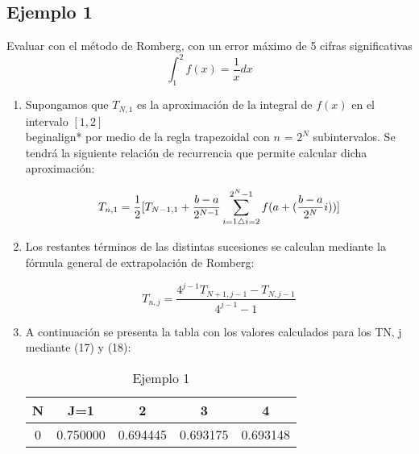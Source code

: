 \documentclass[journal,transmag]{IEEEtran}
\theoremstyle{mytheoremstyle}
\theoremstyle{mytheoremstyle}
\theoremstyle{myproblemstyle}
\begin{document}
    \subsection{Ejemplo 1}
    Evaluar con el método de Romberg, con un error máximo de 5 cifras significativas
    \begin{equation} 
        \int_1^2 f(x)=\frac{1}{x} dx
    \end{equation}
    \begin{enumerate}
    \item Supongamos que $T_{N,1}$ es la aproximación de la integral de $f(x)$ en el intervalo $[1,2]$ \\begin{align*}
        por medio de la regla trapezoidal con $n$ = $2^N$ subintervalos. Se tendrá la siguiente relación de recurrencia
        que permite calcular dicha aproximación: \\
        \begin{center}
            \begin{equation} \footnotesize
                T_{n,1} = \frac{1}{2}[T_{N-1,1} + \frac{{b-a}}{2^{N-1}}\displaystyle\sum_{{i=1 {\triangle i=2}}}^{{2^N-1}} f(a+(\frac{b-a}{2^N}i))]
            \end{equation}
        \end{center}
    \item  Los restantes términos de las distintas sucesiones se calculan mediante la fórmula
    general de extrapolación de Romberg: \\ 
    \begin{center}
        \begin{equation}
            T_{n,j} = \frac{4^{j-1}T_{N+1,j-1}-T_{N,j-1}}{4^{j-1}-1}
        \end{equation}
    \end{center}
    \item   A continuación se presenta la tabla con los valores calculados para los TN, j
    mediante (17) y (18): \\
    \begin{center}
        \begin{table}[h]
            \begin{center}
                \caption{Ejemplo 1}
                \begin{tabular}{| c | c | c | c | c |}
                    \hline
                N & J=1 & 2 & 3 & 4 \\ \hline
                0 & 0.750000 & 0.694445 & 0.693175  & 0.693148\\ \hline

\end{tabular}
\end{center}
\end{table}
\end{center}
\end{enumerate}
\end{document}
